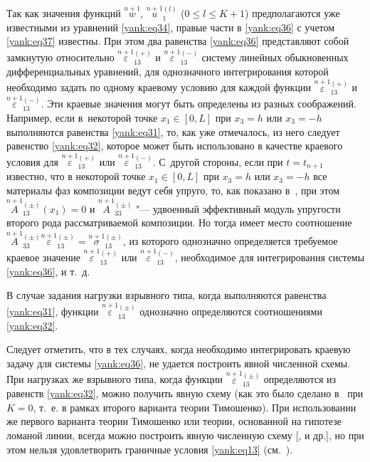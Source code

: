 Так как значения функций $\overset{n+1}{w}$, $\overset{n+1}{u}{}_1^{(l)}
$ ($0\le l\le K+1$) предполагаются уже известными из
уравнений \eqref{yank:eq34}, правые части в \eqref{yank:eq36} с учетом \eqref{yank:eq37} известны. 
При этом два
равенства \eqref{yank:eq36} представляют собой замкнутую относительно 
$\overset{n+1} {\varepsilon}{}_{13}^{(+)}$ и $\overset{n+1}{\varepsilon}{} _{13}^{(-)}$ систему линейных обыкновенных дифференциальных
уравнений, для однозначного интегрирования которой необходимо задать по
одному краевому условию для каждой функции $\overset{n+1}{\varepsilon}{}_{13}^{(+)}$ и $\overset{n+1}{\varepsilon}{}_{13}^{(-)}$. 
Эти краевые значения могут быть определены из разных соображений. 
Например, если в~некоторой точке $x_1 \in [0,L]$ при $x_3 =h$ или $x_3
=-h$ выполняются равенства \eqref{yank:eq31}, то, как уже отмечалось, из него следует
равенство \eqref{yank:eq32}, которое может быть использовано в качестве краевого условия
для $\overset{n+1}{\varepsilon}{}_{13}^{(+)}$ или $\overset{n+1}{\varepsilon}{}_{13}^{(-)}$. 
С~другой стороны, если при $t=t_{n+1}$ известно, что в некоторой точке $x_1 \in [0,L]$ при $x_3 =h$ или $x_3 =-h$ все материалы фаз композиции ведут себя упруго, то, как показано в~\cite{yank:bib13}, 
при этом $\overset{n+1}{A}{}_{13}^{(\pm )} (x_1 )=0$ и $\overset{n+1}{A}{}_{33}^{(\pm )} $ "--- удвоенный эффективный модуль упругости второго рода рассматриваемой композиции. 
Но тогда имеет место соотношение $\overset {n+1}{A}{}_{33}^{(\pm )} \overset{n+1}{\varepsilon}{}_{13}^{(\pm )}
=\overset{n+1}{\sigma}{}_{13}^{(\pm )}$, из которого однозначно определяется требуемое краевое значение $\overset{n+1}{\varepsilon} {}_{13}^{(+)}$ или $\overset{n+1}{\varepsilon}{}_{13}^{(-)} $, необходимое для интегрирования системы \eqref{yank:eq36}, и т.~д.

В случае задания нагрузки взрывного типа, когда выполняются равенства \eqref{yank:eq31},
функции $\overset{n+1}{\varepsilon}{}_{13}^{(\pm )}$ однозначно
определяются соотношениями \eqref{yank:eq32}.

Следует отметить, что в тех случаях, когда необходимо интегрировать краевую
задачу для системы \eqref{yank:eq36}, не удается построить явной численной схемы. При
нагрузках же взрывного типа, когда функции $\overset{n+1}{\varepsilon}{}_{13}^{(\pm )}$ определяются из равенств \eqref{yank:eq32}, можно получить явную
схему (как это было сделано в~\cite{yank:bib13} при $K=0$, т.~е. в рамках второго варианта теории Тимошенко). 
При использовании же первого варианта теории Тимошенко или теории, основанной на гипотезе ломаной линии, всегда можно построить явную численную схему [,  и др.], но при этом нельзя удовлетворить граничные условия \eqref{yank:eq13} (см.~\cite{yank:bib13}).



